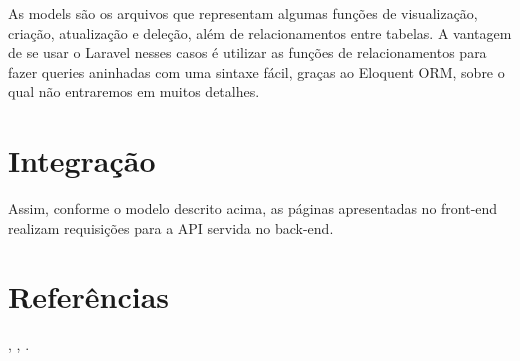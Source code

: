 \documentclass[12pt]{article}
\begin{document}
As models são os arquivos que representam
algumas funções de visualização, criação,
atualização e deleção, além de relacionamentos
entre tabelas. A vantagem de se usar o Laravel
nesses casos é utilizar as funções
de relacionamentos para fazer queries aninhadas
com uma sintaxe fácil, graças ao Eloquent ORM,
sobre o qual não entraremos em muitos detalhes.

\section{Integração}

Assim, conforme o modelo descrito acima, as páginas
apresentadas no front-end realizam requisições para a API
servida no back-end.



\section{Referências}

\cite{1}, \cite{2}, \cite{3}.



\end{document}
